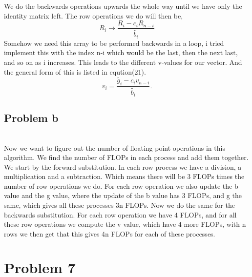 \documentclass[english,notitlepage]{revtex4-1}  %
\begin{document}
We do the backwards operations upwards the whole way until we have only the identity matrix left. The row operations we do will then be,
\begin{equation}
R_i \rightarrow \frac{R_i  - c_i R_{n - i}}{\tilde{b_i}}
\end{equation}
Somehow we need this array to be performed backwards in a loop, i tried implement this with the index n-i which would be the last, then the next last, and so on as i increases. This leads to the different v-values for our vector. And the general form of this is listed in eqution(21).
\begin{equation}
  v_i = \frac{\tilde{g_i} - c_i v_{n - i}}{\tilde{b_i}}.
\end{equation}


 \subsection*{Problem b}\
 \\
Now we want to figure out the number of floating point operations in this algorithm. We find the number of FLOPs in each process and add them together. We start by the forward substitution. In each row process we have a division, a multiplication and a subtraction. Which means there will be 3 FLOPs times the number of row operations we do.  For each row operation we also update the b value and the g value, where the update of the b value has 3 FLOPs, and g the same, which gives all these processes 3n FLOPs. Now we do the same for the backwards substitution. For each row operation we have 4 FLOPs, and for all these row operations we compute the v value, which have 4 more FLOPs, with n rows we then get that this gives 4n FLOPs for each of these processes. %














 \section*{Problem 7}
\end{document}
